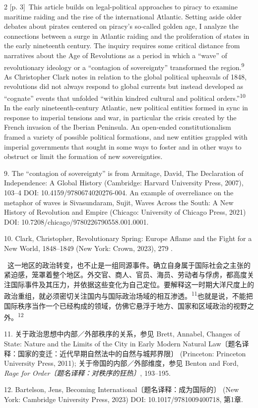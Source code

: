 \documentclass[10pt,a4paper]{article}
\begin{document}
\begin{paracol}{2}
{\scriptsize\color{gray} [p. 3]}\ This article builds on legal-political approaches to piracy to examine maritime raiding and the rise of the international Atlantic. Setting aside older debates about pirates centered on piracy’s so-called golden age, I analyze the connections between a surge in Atlantic raiding and the proliferation of states in the early nineteenth century. The inquiry requires some critical distance from narratives about the Age of Revolutions as a period in which a “wave” of revolutionary ideology or a “contagion of sovereignty” transformed the region.\nobreak\textsuperscript{9} As Christopher Clark notes in relation to the global political upheavals of 1848, revolutions did not always respond to global currents but instead developed as “cognate” events that unfolded “within kindred cultural and political orders.”\nobreak\textsuperscript{10} In the early nineteenth-century Atlantic, new political entities formed in sync in response to imperial tensions and war, in particular the crisis created by the French invasion of the Iberian Peninsula. An open-ended constitutionalism framed a variety of possible political formations, and new entities grappled with imperial governments that sought in some ways to foster and in other ways to obstruct or limit the formation of new sovereignties.\par{\small 9. The “contagion of sovereignty” is from Armitage, David, The Declaration of Independence: A Global History (Cambridge: Harvard University Press, 2007), 103–4 DOI: 10.4159/9780674020276-004. An example of overreliance on the metaphor of waves is Sivasundaram, Sujit, Waves Across the South: A New History of Revolution and Empire (Chicago: University of Chicago Press, 2021) DOI: 10.7208/chicago/9780226790558.001.0001.\par}{\small 10. Clark, Christopher, Revolutionary Spring: Europe Aflame and the Fight for a New World, 1848–1849 (New York: Crown, 2023), 279 .\par}
\switchcolumn*
{\scriptsize\color{gray} [p. 3]}\ 这一地区的政治转变，也不止是一组同源事件。确立自身属于国际社会之主张的紧迫感，笼罩着整个地区。外交官、商人、官员、海员、劳动者与俘虏，都高度关注国际事件及其压力，并依据这些变化为自己定位。要解释这一时期大洋尺度上的政治重组，就必须密切关注国内与国际政治场域的相互渗\mbox{透。\textsuperscript{11}}也就是说，不能把国际秩序当作一个已经构成的领域，仿佛它悬浮于地方、国家和区域政治的视野之\mbox{外。\textsuperscript{12}}\par{\small 11. 关于政治思想中内部／外部秩序的关系，参见 Brett, Annabel, Changes of State: Nature and the Limits of the City in Early Modern Natural Law〔题名译释：国家的变迁：近代早期自然法中的自然与城邦界限〕 (Princeton: Princeton University Press, 2011); 关于帝国的内部／外部维度，参见 Benton and Ford, \textit{Rage for Order〔题名译释：对秩序的狂热〕}, 193–195.\par}{\small 12. Bartelson, Jens, Becoming International〔题名译释：成为国际的〕 (New York: Cambridge University Press, 2023) DOI: 10.1017/9781009400718, 第1章.\par}

\end{paracol}
\end{document}
